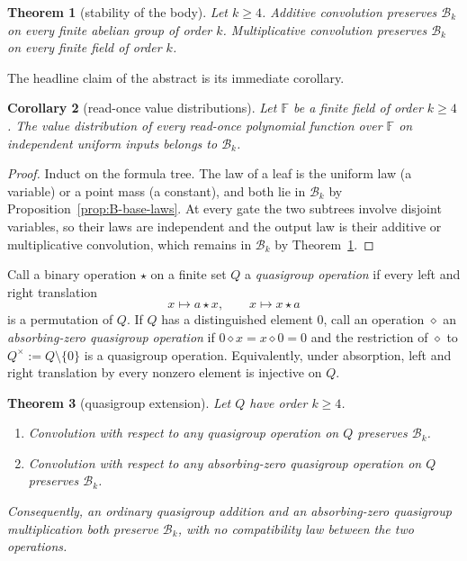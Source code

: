 \documentclass[11pt]{article}
\newtheorem{theorem}{Theorem}[section]
\newtheorem{corollary}[theorem]{Corollary}
\theoremstyle{definition}
\theoremstyle{remark}
\newcommand{\F}{\mathbb{F}}
\newcommand{\body}{\mathcal{B}}
\begin{document}
\begin{theorem}[stability of the body]\label{thm:body}
Let $k\ge4$.  Additive convolution preserves $\body_k$ on every finite
abelian group of order $k$.  Multiplicative convolution preserves
$\body_k$ on every finite field of order $k$.
\end{theorem}

The headline claim of the abstract is its immediate corollary.

\begin{corollary}[read-once value distributions]\label{cor:readonce}
Let $\F$ be a finite field of order $k\ge4$.  The value distribution of
every read-once polynomial function over $\F$ on independent uniform
inputs belongs to $\body_k$.
\end{corollary}

\begin{proof}
Induct on the formula tree.  The law of a leaf is the uniform law (a
variable) or a point mass (a constant), and both lie in $\body_k$ by
Proposition~\ref{prop:B-base-laws}.  At every gate the two subtrees
involve disjoint variables, so their laws are independent and the output
law is their additive or multiplicative convolution, which remains in
$\body_k$ by Theorem~\ref{thm:body}.
\end{proof}

Call a binary operation $\star$ on a finite set $Q$ a
\emph{quasigroup operation} if every left and right translation
\[
 x\longmapsto a\star x,\qquad x\longmapsto x\star a
\]
is a permutation of $Q$.  If $Q$ has a distinguished element $0$, call
an operation $\diamond$ an \emph{absorbing-zero quasigroup operation} if
$0\diamond x=x\diamond0=0$ and the restriction of $\diamond$ to
$Q^\times:=Q\setminus\{0\}$ is a quasigroup operation.  Equivalently, under
absorption, left and right translation by every nonzero element is injective
on $Q$.

\begin{theorem}[quasigroup extension]\label{thm:quasigroup}
Let $Q$ have order $k\ge4$.
\begin{enumerate}
\item Convolution with respect to any quasigroup operation on $Q$
preserves $\body_k$.
\item Convolution with respect to any absorbing-zero quasigroup operation
on $Q$ preserves $\body_k$.
\end{enumerate}
Consequently, an ordinary quasigroup addition and an absorbing-zero
quasigroup multiplication both preserve $\body_k$, with no compatibility
law between the two operations.
\end{theorem}
\end{document}

